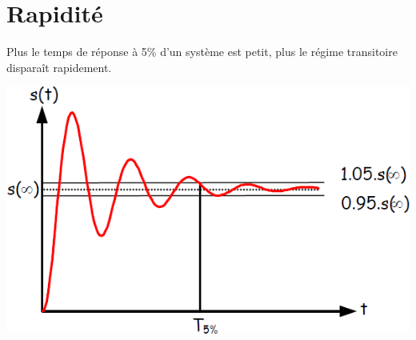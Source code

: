 \documentclass[10pt,fleqn]{article} %
\begin{document}
\section{Rapidité}
\noindent\begin{minipage}[c]{.75\linewidth}
\begin{resultat}
Plus le temps de réponse à 5\;\% d'un système est petit, plus le régime transitoire disparaît rapidement.
\end{resultat}
\end{minipage} \hfill
\begin{minipage}[c]{.2\linewidth}
\begin{center}
\includegraphics[width=\linewidth]{images/t5pcent}
\end{center}
\end{minipage}
\end{document}
